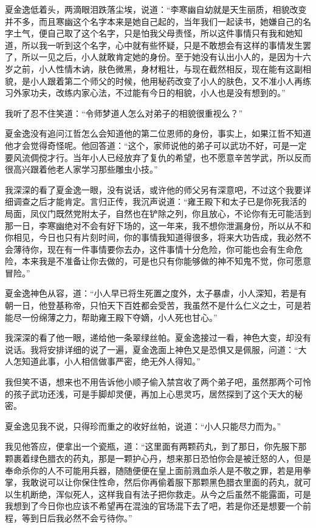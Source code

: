 夏金逸低着头，两滴眼泪跌落尘埃，说道：“李寒幽自幼就是天生丽质，相貌改变并不多，而且寒幽这个名字本来是她自己起的，当年我们一起读书，她嫌自己的名字土气，便自己取了这个名字，只是怕我父母责怪，所以这件事情只有我和她知道，所以我一听到这个名字，心中就有些怀疑，只是不敢想会有这样的事情发生罢了，所以一见之后，小人就敢肯定她的身份。至于她没有认出小人的，是因为十六岁之前，小人性情木讷，肤色微黑，身材粗壮，与现在截然相反，现在能有这副相貌，是小人跟着第二个师父的时候，他用秘药改变了小人的肤色，又不准小人再练习外家功夫，改练内家心法，不过能有今日的相貌，小人也是没有想到的。”

我听了忍不住笑道：“令师梦道人怎么对弟子的相貌很重视么？”

夏金逸没有追问江哲怎么会知道他的第二位恩师的身份，事实上，如果江哲不知道他才会觉得奇怪呢。他回答道：“这个，家师说他的弟子可以武功不好，可是一定要风流倜傥才行。当年小人已经放弃了复仇的希望，也不愿意辛苦学武，所以反而很高兴跟着他老人家学习那些雕虫小技。”

我深深的看了夏金逸一眼，没有说话，或许他的师父另有深意吧，不过这个我要详细调查之后才能肯定。言归正传，我沉声说道：“雍王殿下和太子已是你死我活的局面，凤仪门既然党附太子，自然也在铲除之列，你且放心，不论你有无可能活到那一日，李寒幽绝对不会有好下场的，这一年来，我不想你泄漏身份，所以从不和你相见，今日也只有片刻时间，你的事情我知道得很多，将来大功告成，我必然不会薄待你，现在有一件事情要你去办，这件事情十分危险，你可能也会有生命危险，本来我是不准备让你去做的，可是也只有你能够做的神不知鬼不觉，你可愿意冒险。”

夏金逸神色从容，道：“小人早已将生死置之度外，太子暴虐，小人深知，若是有朝一日，他登基称帝，只怕天下百姓都会受苦，我虽然不是什么仁义之士，可是若能尽一份绵薄之力，帮助雍王殿下夺嫡，小人死也甘心。”

我深深的看了他一眼，递给他一条翠绿丝帕。夏金逸接过一看，神色大变，却没有说话。我将安排详细的说了一遍，夏金逸面上神色又是恐惧又是佩服，问道：“大人怎知道此事，小人相信做事严密，绝无外人得知。”

我但笑不语，想来也不用告诉他小顺子偷入禁宫收了两个弟子吧，虽然那两个可怜的孩子武功还浅，可是手脚却灵便，再加上心思灵巧，居然探到了这个天大的秘密。

夏金逸见我不说，只得珍而重之的收好丝帕，说道：“小人只能尽力而为。”

我见他答应，便拿出一个瓷瓶，道：“这里面有两颗药丸，到了那日，你先服下那颗裹着绿色腊衣的药丸，那是一颗护心丹，想来那日恐怕你会是被迁怒的人，但是奉命杀你的人不可能用兵器，随随便便在皇上面前溅血杀人是不敬之罪，若是用拳掌，我敢说可以让你保住性命，然后你再偷着服下那颗黑色腊衣里面的药丸，就可以生机断绝，浑似死人，这样我自有法子把你救走。从今之后虽然不能露面，可是我想到了今日你也应该不希望再在混浊的官场混下去了吧，若是你还是想要一个前程，等到日后我必然不会亏待你。”

